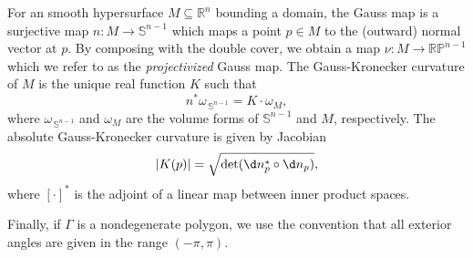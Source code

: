 For an smooth hypersurface $M \subseteq \mathbb{R}^n$ bounding a domain, the Gauss map is a surjective map $n \colon M \to \mathbb{S}^{n-1}$ which maps a point $p \in M$ to the (outward) normal vector at $p$. By composing with the double cover, we obtain a map $\nu \colon M \to \mathbb{RP}^{n-1}$ which we refer to as the \textit{projectivized} Gauss map. The Gauss-Kronecker curvature of $M$ is the unique real function $K$ such that 
\begin{equation}
  n^*\omega_{\,\mathbb{S}^{n-1}} = K \cdot \omega_M,
\end{equation}
where $\omega_{\,\mathbb{S}^{n-1}}$ and $\omega_M$ are the volume forms of $\mathbb{S}^{n-1}$ and $M$, respectively. The absolute Gauss-Kronecker curvature is given by Jacobian
\begin{equation}
  |K(p)| = \sqrt{\det(\d n_p^{*} \circ \d n_p)},
\end{equation}
where $[\cdot]^*$ is the adjoint of a linear map between inner product spaces.

Finally, if $\Gamma$ is a nondegenerate polygon, we use the convention that all exterior angles are given in the range $(-\pi, \pi)$.
